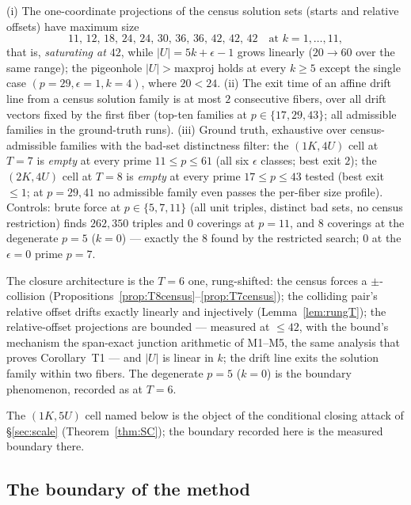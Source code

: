 \begin{proposition}
\label{prop:shearT78}
\textup{(i)} The one-coordinate projections of the census solution sets
(starts and relative offsets) have maximum size
\[
11,\,12,\,18,\,24,\,24,\,30,\,36,\,36,\,42,\,42,\,42
\quad\text{at }k=1,\dots,11,
\]
that is, \emph{saturating at $42$}, while
$|U|=5k+\epsilon-1$ grows linearly ($20\to60$ over the same range); the
pigeonhole $|U|>\text{maxproj}$ holds at every $k\ge5$ except the single
case $(p{=}29,\epsilon{=}1,k{=}4)$, where $20<24$. \textup{(ii)} The
exit time of an affine drift line from a census solution family is at
most $2$ consecutive fibers, over all drift vectors fixed by the first
fiber (top-ten families at $p\in\{17,29,43\}$; all admissible families
in the ground-truth runs). \textup{(iii)} Ground truth, exhaustive over
census-admissible families with the bad-set distinctness filter: the
$(1K,4U)$ cell at $T=7$ is \emph{empty} at every prime
$11\le p\le61$ (all six $\epsilon$ classes; best exit $2$); the
$(2K,4U)$ cell at $T=8$ is \emph{empty} at every prime $17\le p\le43$
tested (best exit $\le1$; at $p=29,41$ no admissible family even passes
the per-fiber size profile). Controls: brute force at $p\in\{5,7,11\}$
(all unit triples, distinct bad sets, no census restriction) finds
$262{,}350$ triples and $0$ coverings at $p=11$, and $8$ coverings at
the degenerate $p=5$ ($k=0$) --- exactly the $8$ found by the
restricted search; $0$ at the $\epsilon=0$ prime $p=7$.
\end{proposition}

The closure architecture is the $T=6$ one, rung-shifted: the census
forces a $\pm$-collision (Propositions~\ref{prop:T8census}--\ref{prop:T7census});
the colliding pair's relative offset drifts exactly linearly and
injectively (Lemma~\ref{lem:rungT}); the relative-offset projections are
bounded --- measured at $\le42$, with the bound's mechanism the
span-exact junction arithmetic of M1--M5, the same analysis that proves
Corollary~T1 --- and $|U|$ is linear in $k$; the drift line exits the
solution family within two fibers. The degenerate $p=5$ ($k=0$) is the
boundary phenomenon, recorded as at $T=6$.

The $(1K,5U)$ cell named below is the object of the conditional
closing attack of \S\ref{sec:scale} (Theorem~\ref{thm:SC}); the boundary
recorded here is the measured boundary there.

\subsection{The boundary of the method}

